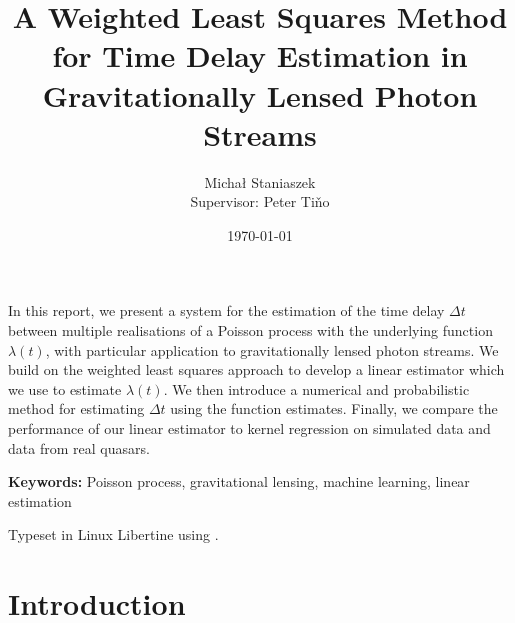 \documentclass[a4paper,11pt]{article}
\title{A Weighted Least Squares Method for Time Delay Estimation in Gravitationally Lensed Photon Streams}
\author{\Large{Micha{\l} Staniaszek} \\\small{Supervisor: Peter Tiňo}}
\date{\today}
\begin{document}
\maketitle


\thispagestyle{empty}
\newpage
{}
In this report, we present a system for the estimation of the
time delay $\Delta t$ between multiple realisations of a Poisson
process with the underlying function $\lambda(t)$, with particular
application to gravitationally lensed photon streams. We build on
the weighted least squares approach to develop a linear estimator 
which we use to estimate $\lambda(t)$. We then introduce a numerical
and probabilistic method for estimating $\Delta t$ using
the function estimates. Finally, we compare the performance of our
linear estimator to kernel regression on simulated data and data 
from real quasars.

\vspace{1.0cm}\textbf{Keywords: }Poisson process, gravitational lensing,
 machine learning, linear estimation

\begin{center}
\vspace*{\fill}\scriptsize{Typeset in Linux Libertine using \XeLaTeX}.
\end{center}
\newpage
\tableofcontents
\newpage
{}
\section{Introduction}
\label{sec-1}
\end{document}
